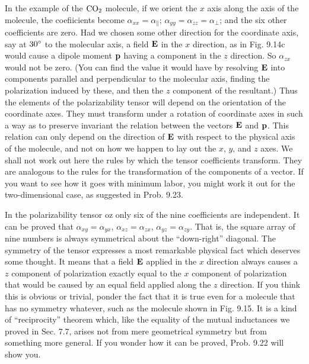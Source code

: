 In the example of the $\textup{CO}_2$ molecule, if we orient the $x$ axis along
the axis of the molecule, the coefiicients become $\alpha_{xx}=\alpha_\parallel$;
$\alpha_{yy}=\alpha_{zz}=\alpha_\perp$; and the six other coefficients are zero. Had we
chosen some other direction for the coordinate axis, say at $30\mspace{0mu}^\circ$ to the
molecular axis, a field $\mathbf{E}$ in the $x$ direction, as in Fig. 9.14c would cause
a dipole moment $\mathbf{p}$ having a component in the $z$ direction. So $\alpha_{zx}$
would not be zero. (You can find the value it would have by resolving
$\mathbf{E}$ into components parallel and perpendicular to the molecular
axis, finding the polarization induced by these, and then the $z$ component
of the resultant.) Thus the elements of the polarizability
tensor will depend on the orientation of the coordinate axes. They
must transform under a rotation of coordinate axes in such a way as
to preserve invariant the relation between the vectors $\mathbf{E}$ and $\mathbf{p}$. This
relation can only depend on the direction of $\mathbf{E}$ with respect to the
physical axis of the molecule, and not on how we happen to lay out
the $x$, $y$, and $z$ axes. We shall not work out here the rules by which
the tensor coefficients transform. They are analogous to the rules
for the transformation of the components of a vector. If you want
to see how it goes with minimum labor, you might work it out for the
two-dimensional case, as suggested in Prob. 9.23.

In the polarizability tensor oz only six of the nine coefficients are
independent. It can be proved that
$\alpha_{xy}=\alpha_{yx}$, $\alpha_{xz}=\alpha_{zx}$, $\alpha_{yz}=\alpha_{zy}$.
That is, the square array of nine numbers is always symmetrical
about the ``down-right'' diagonal. The symmetry of the
tensor expresses a most remarkable physical fact which deserves
some thought. It means that a field $\mathbf{E}$ applied in the $x$ direction
always causes a $z$ component of polarization exactly equal to the
$x$ component of polarization that would be caused by an equal field
applied along the $z$ direction. If you think this is obvious or trivial,
ponder the fact that it is true even for a molecule that has no symmetry
whatever, such as the molecule shown in Fig. 9.15. It is a kind
of ``reciprocity'' theorem which, like the equality of the mutual 
inductances we proved in Sec. 7.7, arises not from mere geometrical
symmetry but from something more general. If you wonder how it
can be proved, Prob. 9.22 will show you.

